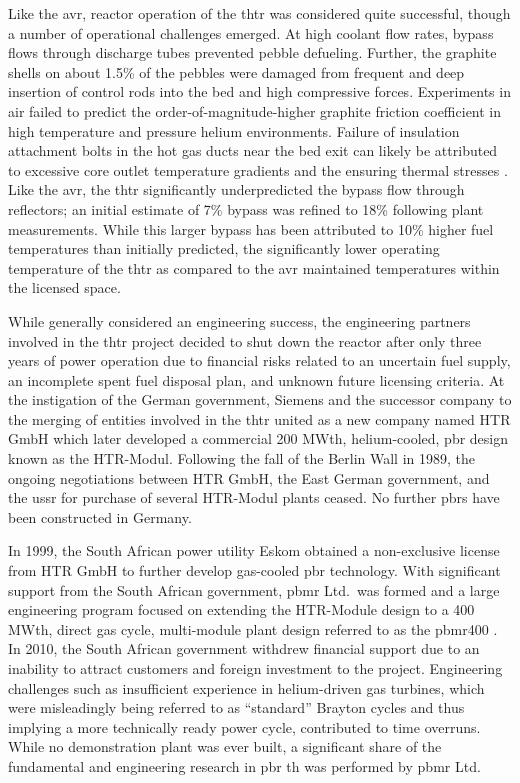 Like the \gls{avr}, reactor operation of the \gls{thtr} was considered quite successful, though a number of operational challenges emerged. At high coolant flow rates, bypass flows through discharge tubes prevented pebble defueling. Further, the graphite shells on about 1.5\% of the pebbles were damaged from frequent and deep insertion of control rods into the bed and high compressive forces. Experiments in air failed to predict the order-of-magnitude-higher graphite friction coefficient in high temperature and pressure helium environments. Failure of insulation attachment bolts in the hot gas ducts near the bed exit can likely be attributed to excessive core outlet temperature gradients and the ensuring thermal stresses \cite{moormann}. Like the \gls{avr}, the \gls{thtr} significantly underpredicted the bypass flow through reflectors; an initial estimate of 7\% bypass was refined to 18\% following plant measurements. While this larger bypass has been attributed to 10\% higher fuel temperatures than initially predicted, the significantly lower operating temperature of the \gls{thtr} as compared to the \gls{avr} maintained temperatures within the licensed space.

While generally considered an engineering success, the engineering partners involved in the \gls{thtr} project decided to shut down the reactor after only three years of power operation due to financial risks related to an uncertain fuel supply, an incomplete spent fuel disposal plan, and unknown future licensing criteria. At the instigation of the German government, Siemens and the successor company to the merging of entities involved in the \gls{thtr} united as a new company named HTR GmbH which later developed a commercial 200 MWth, helium-cooled, \gls{pbr} design known as the HTR-Modul. Following the fall of the Berlin Wall in 1989, the ongoing negotiations between HTR GmbH, the East German government, and the \gls{ussr} for purchase of several HTR-Modul plants ceased. No further \glspl{pbr} have been constructed in Germany.

In 1999, the South African power utility Eskom obtained a non-exclusive license from HTR GmbH to further develop gas-cooled \gls{pbr} technology. With significant support from the South African government, \gls{pbmr} Ltd.\ was formed and a large engineering program focused on extending the HTR-Module design to a 400 MWth, direct gas cycle, multi-module plant design referred to as the \gls{pbmr400} \cite{thomas, koster}. In 2010, the South African government withdrew financial support due to an inability to attract customers and foreign investment to the project. Engineering challenges such as insufficient experience in helium-driven gas turbines, which were misleadingly being referred to as ``standard'' Brayton cycles and thus implying a more technically ready power cycle, contributed to time overruns. While no demonstration plant was ever built, a significant share of the fundamental and engineering research in \gls{pbr} \gls{th} was performed by \gls{pbmr} Ltd.

